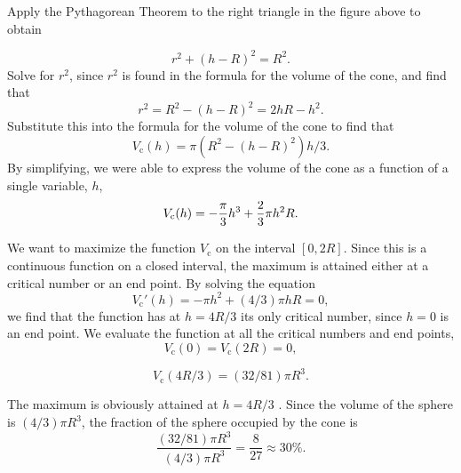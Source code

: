 \documentclass{ximera}
\begin{document}
\begin{example}
\begin{explanation}
\begin{image}
\end{image}

Apply the Pythagorean Theorem to the right triangle in the figure above to obtain

\[
r^2 + (h-R)^2=R^2.
\] 
Solve for $r^2$, since $r^2$ is found in the formula for the volume
of the cone, and find that
\[
r^2=R^2-(h-R)^2=2hR-h^2.
\]  
Substitute this into the formula for the volume of the cone to find that 
\[
 V_{\text{c}}(h)=\pi(R^2-(h-R)^2)h/3. 
 \]
By simplifying, we were able to express the volume of the cone as a function of a single variable, $h$,
\[
 V_{\text{c}}(h)=-{\pi\over3}h^3+{2\over3}\pi h^2R.
 \]

We want to maximize the function $V_{\text{c}}$ on the interval $[0,2R]$.
Since this is a continuous function on a closed interval, the maximum is attained either at a critical number or an end point.
By solving the equation 
\[
V_{\text{c}}'(h)=-\pi h^2+(4/3)\pi h R=0,
\] 
we find that the function has at $h=4R/3$ its only critical number, since $h=0$ is an end point.  We evaluate the function at all the critical numbers and end points,
\[
V_{\text{c}}(0)=V_{\text{c}}(2R)=0,
\]

\[
V_{\text{c}}(4R/3)=(32/81)\pi R^3.
\] 

The maximum is obviously attained at $h=4R/3$ . Since the volume of the sphere is $(4/3)\pi
R^3$, the fraction of the sphere occupied by the cone is
\[
\frac{(32/81)\pi R^3}{(4/3)\pi R^3}=\frac{8}{27}\approx 30\%.
\]
\end{explanation}
\end{example}
\end{document}
